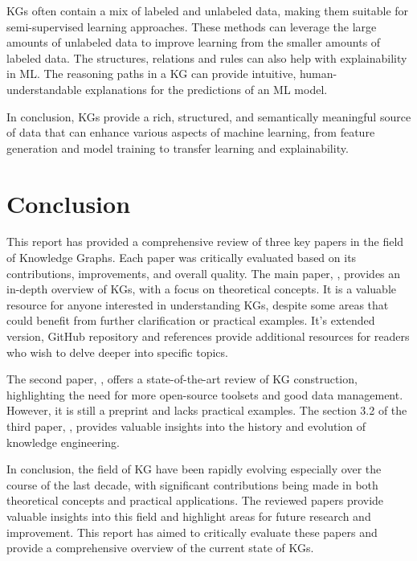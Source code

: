 \documentclass[11pt]{article} %
\begin{document}
KGs often contain a mix of labeled and unlabeled data, making them suitable for semi-supervised learning approaches. These methods can leverage the large amounts of unlabeled data to improve learning from the smaller amounts of labeled data. The structures, relations and rules can also help with explainability in ML. The reasoning paths in a KG can provide intuitive, human-understandable explanations for the predictions of an ML model.

In conclusion, KGs provide a rich, structured, and semantically meaningful source of data that can enhance various aspects of machine learning, from feature generation and model training \cite*{KG21} to transfer learning and explainability.

\newpage
\section{Conclusion}

This report has provided a comprehensive review of three key papers in the field of Knowledge Graphs. Each paper was critically evaluated based on its contributions, improvements, and overall quality. The main paper,  \cite*{KG21}, provides an in-depth overview of KGs, with a focus on theoretical concepts. It is a valuable resource for anyone interested in understanding KGs, despite some areas that could benefit from further clarification or practical examples. It's extended version, GitHub repository and references provide additional resources for readers who wish to delve deeper into specific topics.

The second paper,  \cite*{CKG23}, offers a state-of-the-art review of KG construction, highlighting the need for more open-source toolsets and good data management. However, it is still a preprint and lacks practical examples. The section 3.2 of the third paper,  \cite*{KGKE22}, provides valuable insights into the history and evolution of knowledge engineering.

In conclusion, the field of KG have been rapidly evolving especially over the course of the last decade, with significant contributions being made in both theoretical concepts and practical applications. The reviewed papers provide valuable insights into this field and highlight areas for future research and improvement. This report has aimed to critically evaluate these papers and provide a comprehensive overview of the current state of KGs.







\end{document}
